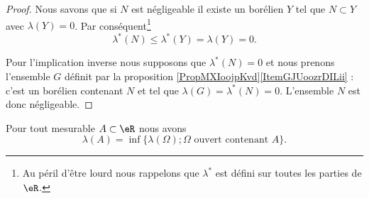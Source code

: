\begin{proof}
    Nous savons que si \( N\) est négligeable il existe un borélien \( Y\) tel que \( N\subset Y\) avec \( \lambda(Y)=0\). Par conséquent\footnote{Au péril d'être lourd nous rappelons que \( \lambda^*\) est défini sur toutes les parties de \( \eR\).}
    \begin{equation}
        \lambda^*(N)\leq \lambda^*(Y)=\lambda(Y)=0.
    \end{equation}
    
    Pour l'implication inverse nous supposons que \( \lambda^*(N)=0\) et nous prenons l'ensemble \( G\) définit par la proposition \ref{PropMXIoojpKvd}\ref{ItemGJUoozrDILii} : c'est un borélien contenant \( N\) et tel que \( \lambda(G)=\lambda^*(N)=0\). L'ensemble \( N\) est donc négligeable.
\end{proof}

\begin{theorem} \label{ThoHFXooONFRN}
    Pour tout mesurable \( A\subset \eR\) nous avons
    \begin{equation}
        \lambda(A)=\inf\{ \lambda(\Omega); \Omega\text{ ouvert contenant } A \}.
    \end{equation}
\end{theorem}

